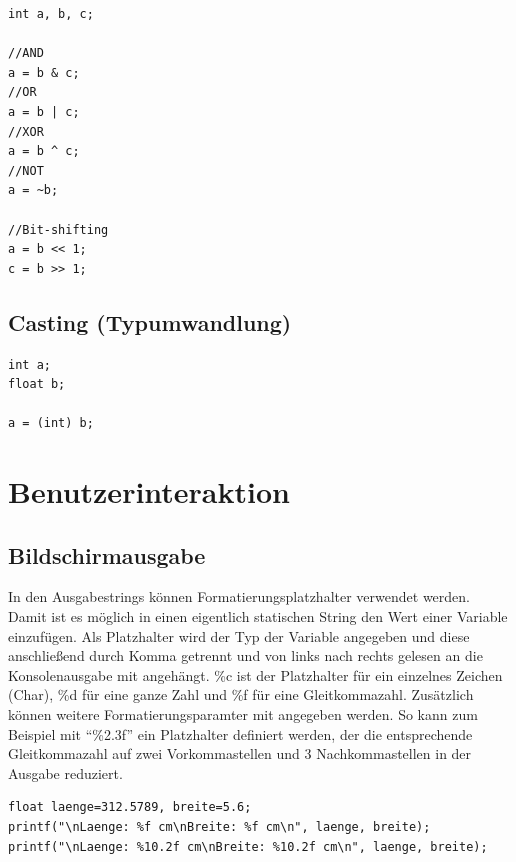 \documentclass[11pt,a4paper,ngerman, fleqn]{article}
\let\qt\enquote
\let\noi\noindent
\begin{document}
\begin{lstlisting}
int a, b, c;

//AND
a = b & c;
//OR
a = b | c;
//XOR
a = b ^ c;
//NOT
a = ~b;

//Bit-shifting
a = b << 1;
c = b >> 1;
\end{lstlisting}

\subsection{Casting (Typumwandlung)}
\label{sec:25}


\begin{lstlisting}
int a;
float b;

a = (int) b;
\end{lstlisting}

\section{Benutzerinteraktion}
\subsection{Bildschirmausgabe}
\label{sec:31}


\noi In den Ausgabestrings können Formatierungsplatzhalter verwendet werden. Damit ist es möglich in einen eigentlich statischen String den Wert einer Variable einzufügen. Als Platzhalter wird der Typ der Variable angegeben und diese anschließend durch Komma getrennt und von links nach rechts gelesen an die Konsolenausgabe mit angehängt. \%c ist der Platzhalter für ein einzelnes Zeichen (Char), \%d für eine ganze Zahl und \%f für eine Gleitkommazahl. Zusätzlich können weitere Formatierungsparamter mit angegeben werden. So kann zum Beispiel mit \qt{\%2.3f} ein Platzhalter definiert werden, der die entsprechende Gleitkommazahl auf zwei Vorkommastellen und 3 Nachkommastellen in der Ausgabe reduziert.

\begin{lstlisting}
float laenge=312.5789, breite=5.6;
printf("\nLaenge: %f cm\nBreite: %f cm\n", laenge, breite);
printf("\nLaenge: %10.2f cm\nBreite: %10.2f cm\n", laenge, breite);
\end{lstlisting}
\end{document}
